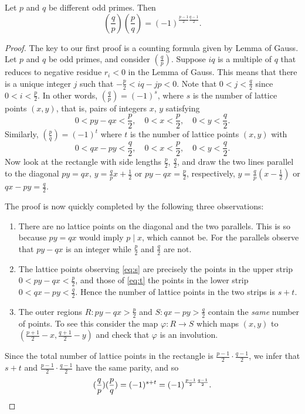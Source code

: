 \begin{theorem}
  \label{quadratic_reciprocity1}
  \leanok
  Let $p$ and $q$ be different odd primes. Then
  \[
  (\frac{q}{p})(\frac{p}{q}) = (-1)^{\frac{p-1}{2} \frac{q-1}{2}}.
  \]
\end{theorem}
\begin{proof}
  The key to our first proof is a counting formula given by Lemma of Gauss. Let $p$ and $q$ be odd primes, and consider $(\frac{q}{p})$. Suppose $iq$ is a multiple of $q$ that reduces to negative residue $r_i < 0$ in the Lemma of Gauss. This means that there is a unique integer $j$ such that $-\frac{p}{2} < iq-jp < 0$. Note that $0 < j < \frac{q}{2}$ since $0 < i < \frac{p}{2}$. In other words, $(\frac{q}{p}) = (-1)^s$, where $s$ is the number of lattice points $(x, y)$, that is, pairs of integers $x$, $y$ satisfying
  \begin{equation} \label{eq:s}
  0 < py - qx < \frac{p}{2}, \quad 0 < x < \frac{p}{2}, \quad 0 < y < \frac{q}{2}.
  \end{equation}
  Similarly, $(\frac{p}{q}) = (-1)^t$ where $t$ is the number of lattice points $(x, y)$ with
  \begin{equation} \label{eq:t}
  0 < qx - py < \frac{q}{2}, \quad 0 < x < \frac{p}{2}, \quad 0 < y < \frac{q}{2}.
  \end{equation}
  Now look at the rectangle with side lengths $\frac{p}{2}$, $\frac{q}{2}$, and draw the two lines parallel to the diagonal $py = qx$, $y = \frac{q}{p}x + \frac{1}{2}$ or $py - qx = \frac{p}{2}$, respectively, $y = \frac{q}{p} \left(x - \frac{1}{2}\right)$ or $qx - py = \frac{q}{2}$.
  
  The proof is now quickly completed by the following three observations:
  \begin{enumerate}
  	\item There are no lattice points on the diagonal and the two parallels. This is so because $py = qx$ would imply $p \mid x$, which cannot be. For the parallels observe that $py - qx$ is an integer while $\frac{p}{2}$ and $\frac{q}{2}$ are not.
  	\item The lattice points observing \eqref{eq:s} are precisely the points in the upper strip $0 < py - qx < \frac{p}{2}$, and those of \eqref{eq:t} the points in the lower strip $0 < qx - py < \frac{q}{2}$. Hence the number of lattice points in the two strips is $s + t$.
  	\item The outer regions $R : py - qx > \frac{p}{2}$ and $S: qx - py > \frac{q}{2}$ contain the \textit{same} number of points. To see this consider the map $\varphi: R \to S$ which maps $(x, y)$ to $\left(\frac{p+1}{2} - x, \frac{q+1}{2} - y\right)$ and check that $\varphi$ is an involution.
  \end{enumerate}
  
  Since the total number of lattice points in the rectangle is $\frac{p-1}{2} \cdot \frac{q-1}{2}$, we infer that $s + t$ and $\frac{p-1}{2} \cdot \frac{q-1}{2}$ have the same parity, and so
  \[
  (\frac{q}{p}) (\frac{p}{q}) = (-1)^{s+t} = (-1)^{\frac{p-1}{2} \frac{q-1}{2}}. \qedhere
  \]
\end{proof}


